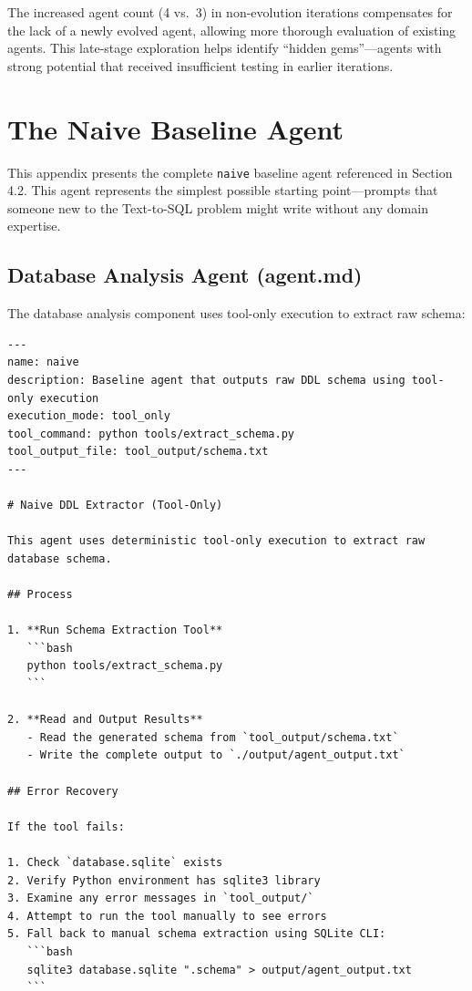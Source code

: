 \documentclass{article}
\begin{document}
The increased agent count (4 vs.\ 3) in non-evolution iterations compensates for the lack of a newly evolved agent, allowing more thorough evaluation of existing agents. This late-stage exploration helps identify ``hidden gems''---agents with strong potential that received insufficient testing in earlier iterations.

\section{The Naive Baseline Agent}
\label{app:naive-baseline}

This appendix presents the complete \texttt{naive} baseline agent referenced in Section 4.2. This agent represents the simplest possible starting point—prompts that someone new to the Text-to-SQL problem might write without any domain expertise.

\subsection{Database Analysis Agent (agent.md)}

The database analysis component uses tool-only execution to extract raw schema:

\begin{verbatim}
---
name: naive
description: Baseline agent that outputs raw DDL schema using tool-only execution
execution_mode: tool_only
tool_command: python tools/extract_schema.py
tool_output_file: tool_output/schema.txt
---

# Naive DDL Extractor (Tool-Only)

This agent uses deterministic tool-only execution to extract raw database schema.

## Process

1. **Run Schema Extraction Tool**
   ```bash
   python tools/extract_schema.py
   ```

2. **Read and Output Results**
   - Read the generated schema from `tool_output/schema.txt`
   - Write the complete output to `./output/agent_output.txt`

## Error Recovery

If the tool fails:

1. Check `database.sqlite` exists
2. Verify Python environment has sqlite3 library
3. Examine any error messages in `tool_output/`
4. Attempt to run the tool manually to see errors
5. Fall back to manual schema extraction using SQLite CLI:
   ```bash
   sqlite3 database.sqlite ".schema" > output/agent_output.txt
   ```
\end{verbatim}
\end{document}
